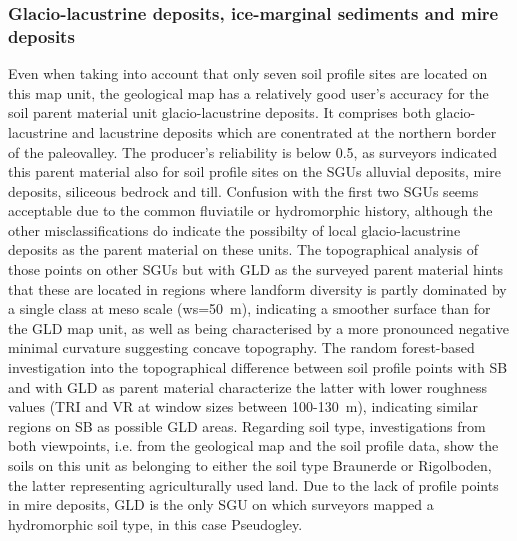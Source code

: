 \documentclass[preprint,12pt,authoryear]{elsarticle}
\begin{document}
\subsubsection{Glacio-lacustrine deposits, ice-marginal sediments and mire deposits}
Even when taking into account that only seven soil profile sites are located on this map unit, the geological map has a relatively good user's accuracy for the soil parent material unit glacio-lacustrine deposits. It comprises both glacio-lacustrine and lacustrine deposits which are conentrated at the northern border of the paleovalley. The producer's reliability is below 0.5, as surveyors indicated this parent material also for soil profile sites on the SGUs alluvial deposits,  mire deposits, siliceous bedrock and till. Confusion with the first two SGUs seems acceptable due to the common fluviatile or hydromorphic history, although the other misclassifications do indicate the possibilty of local glacio-lacustrine deposits as the parent material on these units. The topographical analysis of those points on other SGUs but with GLD as the surveyed parent material hints that these are located in regions where landform diversity is partly dominated by a single class at meso scale (ws=50~m), indicating a smoother surface than for the GLD map unit, as well as being characterised by a more pronounced negative minimal curvature suggesting concave topography. The random forest-based investigation into the topographical difference between soil profile points with SB and with GLD as parent material characterize the latter with lower roughness values  (TRI and VR at window sizes between 100-130~m), indicating similar regions on SB as possible GLD areas. Regarding soil type, investigations from both viewpoints, i.e. from the geological map and the soil profile data, show the soils on this unit as belonging to either the soil type Braunerde or Rigolboden, the latter representing agriculturally used land. Due to the lack of profile points in mire deposits, GLD is the only SGU on which surveyors mapped a hydromorphic soil type, in this case Pseudogley.
\end{document}
